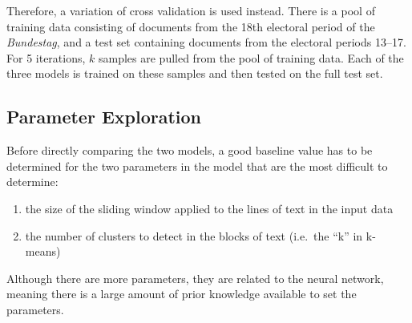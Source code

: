 Therefore, a variation of cross validation is used instead. There is a pool of
training data consisting of documents from the 18th electoral period of the
\emph{Bundestag}, and a test set containing documents from the
electoral periods \numrange{13}{17}.
For 5 iterations, $k$ samples are pulled from the pool of training data. Each
of the three models is trained on these samples and then tested on the full test
set.

\subsection{Parameter Exploration\label{sec:param}}
Before directly comparing the two models, a good baseline value has to be
determined for the two parameters in the model that are the most difficult to
determine:
\begin{enumerate}
  \item the size of the sliding window applied to the lines of text in the input data
  \item the number of clusters to detect in the blocks of text (i.e.\ the ``k''
    in k-means)
\end{enumerate}
Although there are more parameters, they are related to the 
neural network, meaning there is a large amount of prior knowledge available to
set the parameters.


